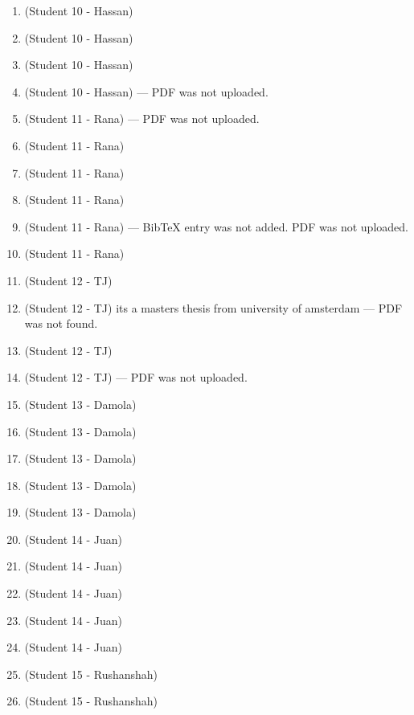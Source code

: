 \begin{enumerate}[label=\#\arabic*]
\item \cite{denes1990new} (Student 10 - Hassan)
\item \cite{etzion1988constructions} (Student 10 - Hassan)
\item \cite{hurlbert1996existence} (Student 10 - Hassan)
\item \cite{nissanov1995brain} (Student 10 - Hassan) --- PDF was not uploaded.
\item \cite{millan2026ritmo} (Student 11 - Rana) --- PDF was not uploaded.
\item \cite{jackson2009research} (Student 11 - Rana)
\item \cite{pages2005optimised} (Student 11 - Rana)
\item \cite{mitchell1997bruijn} (Student 11 - Rana)
\item \cite{delorme1998spectrum} (Student 11 - Rana) --- BibTeX entry was not added. PDF was not uploaded.
\item \cite{burkhardt1994implementing} (Student 11 - Rana)
\item \cite{schusselbauer2021dothraki} (Student 12 - TJ)
\item \cite{kapinya2004evolutionary} (Student 12 - TJ) its a masters thesis from university of amsterdam --- PDF was not found.
\item \cite{burns1992coding} (Student 12 - TJ)
\item \cite{berkowitz2016robust} (Student 12 - TJ) --- PDF was not uploaded.
\item \cite{szentandrasi2012uniform} (Student 13 - Damola)
\item \cite{bruckstein2012simple} (Student 13 - Damola)
\item \cite{wijenayake2015dual} (Student 13 - Damola)
\item \cite{zhu2022hydramarker} (Student 13 - Damola)
\item \cite{herout2013five} (Student 13 - Damola)
\item \cite{paterson1996newI} (Student 14 - Juan)
\item \cite{zhou2021m} (Student 14 - Juan)
\item \cite{albitar2007design} (Student 14 - Juan)
\item \cite{luo2018multi} (Student 14 - Juan)
\item \cite{elahi2023single} (Student 14 - Juan)
\item \cite{salvi2004pattern} (Student 15 - Rushanshah)
\item \cite{gu2023high} (Student 15 - Rushanshah)

\end{enumerate}
